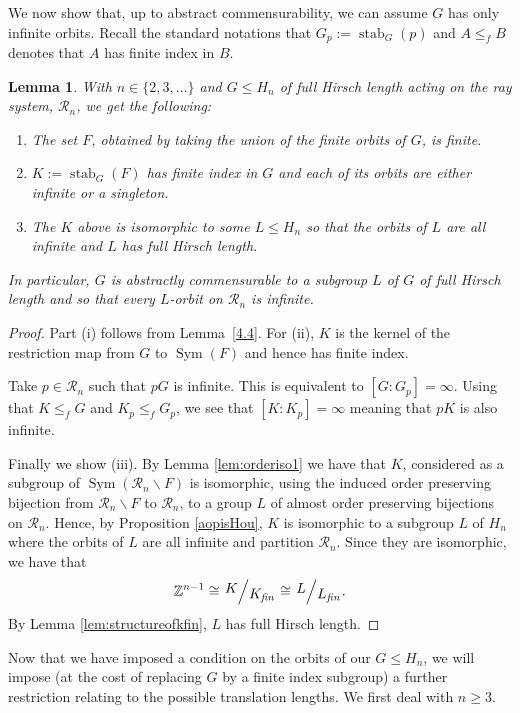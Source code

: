 \documentclass[11pt,a4paper]{amsart}
\renewcommand{\setminus}{\smallsetminus}
\newtheorem{lemma}[theorem]{Lemma}
\theoremstyle{definition}
\theoremstyle{remark}
\newcommand{\Sym}{\operatorname{Sym}}
\newcommand{\Z}{\mathbb Z}
\newcommand{\Ra}{\mathcal{R}}
\newcommand{\quotient}[2]{{\left.\raisebox{.2em}{$#1$}\middle/\raisebox{-.2em}{$#2$}\right.}}
\newcommand{\kfin}{K_{\textit{fin}}}
\newcommand{\lfin}{L_{\textit{fin}}}
\newcommand{\stab}{\operatorname{stab}}
\begin{document}
We now show that, up to abstract commensurability, we can assume $G$ has only infinite orbits. Recall the standard notations that $G_p:=\stab_G(p)$ and $A\le_f B$ denotes that $A$ has finite index in $B$.
\begin{lemma} \label{commensurable} With $n\in \{2, 3, \ldots\}$ and $G\le H_n$ of full Hirsch length acting on the ray system, $\Ra_n$, we get the following:
\begin{enumerate}
\item The set $F$, obtained by taking the union of the finite orbits of $G$, is finite.
\item $K:=\stab_G(F)$ has finite index in $G$ and each of its orbits are either infinite or a singleton.
\item The $K$ above is isomorphic to some $L\le H_n$ so that the orbits of $L$ are all infinite and $L$ has full Hirsch length.
\end{enumerate}
 
In particular, $G$ is abstractly commensurable to a subgroup $L$ of $G$ of full Hirsch length and so that every $L$-orbit on $\Ra_n$ is infinite.  
\end{lemma}

\begin{proof} Part (i) follows from  Lemma~\ref{4.4}. For (ii), $K$ is the kernel of the restriction map from $G$ to $\Sym(F)$ and hence has finite index.


Take $p\in \Ra_n$ such that $pG$ is infinite. This is equivalent to $[G: G_p]=\infty$. Using that $K\le_f G$ and $K_p\le_fG_p$, we see that $[K: K_p]=\infty$ meaning that $pK$ is also infinite.

Finally we show (iii).  By Lemma \ref{lem:orderiso1} we have that $K$, considered as a subgroup of $\Sym(\Ra_n\setminus F)$ is isomorphic, using the induced order preserving bijection from $\Ra_n\setminus F$ to $\Ra_n$, to a group $L$ of almost order preserving bijections on $\Ra_n$. Hence, by Proposition \ref{aopisHou}, $K$ is isomorphic to a subgroup $L$ of $H_n$ where the orbits of $L$ are all infinite and partition $\Ra_n$. Since they are isomorphic, we have that
$$\Z^{n-1}\cong\quotient{K}{\kfin}\cong \quotient{L}{\lfin}.$$
By Lemma \ref{lem:structureofkfin}, $L$ has full Hirsch length.
\end{proof}
Now that we have imposed a condition on the orbits of our $G\le H_n$, we will impose (at the cost of replacing $G$ by a finite index subgroup) a further restriction relating to the possible translation lengths. We first deal with $n\geq 3$.
\end{document}

